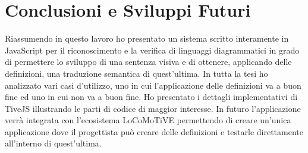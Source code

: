 \chapter{Conclusioni e Sviluppi Futuri}
    Riassumendo in questo lavoro ho presentato un sistema scritto interamente in JavaScript per il riconoscimento e la verifica di linguaggi diagrammatici in grado di permettere lo sviluppo di una sentenza visiva e di ottenere, applicando delle definizioni, una traduzione semantica di quest'ultima.
    \newline
    In tutta la tesi ho analizzato vari casi d'utilizzo, uno in cui l'applicazione delle definizioni va a buon fine ed uno in cui non va a buon fine. Ho presentato i dettagli implementativi di TiveJS illustrando le parti di codice di maggior interesse.
    \newline
    In futuro l'applicazione verrà integrata con l'ecosistema LoCoMoTiVE permettendo di creare un'unica applicazione dove il progettista può creare delle definizioni e testarle direttamente all'interno di quest'ultima.